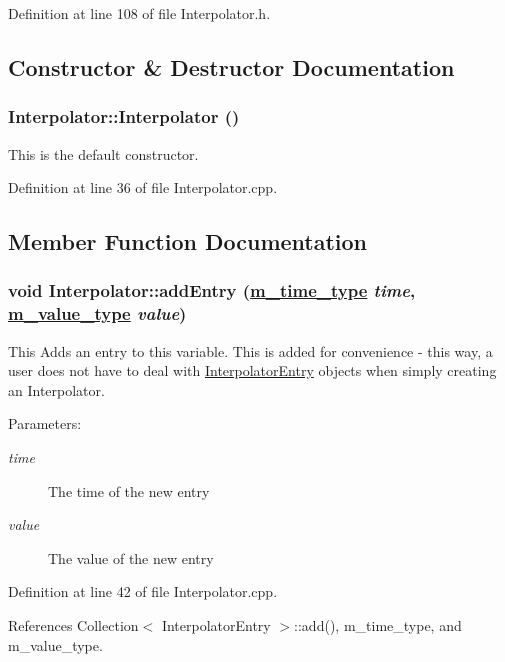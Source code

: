 Definition at line 108 of file Interpolator.h.

\subsection{Constructor \& Destructor Documentation}
\hypertarget{classInterpolator_a0}{
\subsubsection[Interpolator]{\setlength{\rightskip}{0pt plus 5cm}Interpolator::Interpolator ()}}
\label{classInterpolator_a0}


This is the default constructor. 

Definition at line 36 of file Interpolator.cpp.

\subsection{Member Function Documentation}
\hypertarget{classInterpolator_a2}{
\subsubsection[addEntry]{\setlength{\rightskip}{0pt plus 5cm}void Interpolator::add\-Entry (\hyperlink{Types_8h_a2}{m\_\-time\_\-type} {\em time}, \hyperlink{Types_8h_a3}{m\_\-value\_\-type} {\em value})}}
\label{classInterpolator_a2}


This Adds an entry to this variable. This is added for convenience - this way, a user does not have to deal with \hyperlink{classInterpolatorEntry}{Interpolator\-Entry} objects when simply creating an Interpolator. \begin{Desc}
\item[Parameters:]
\begin{description}
\item[{\em time}]The time of the new entry \item[{\em value}]The value of the new entry \end{description}
\end{Desc}


Definition at line 42 of file Interpolator.cpp.

References Collection$<$ Interpolator\-Entry $>$::add(), m\_\-time\_\-type, and m\_\-value\_\-type.

